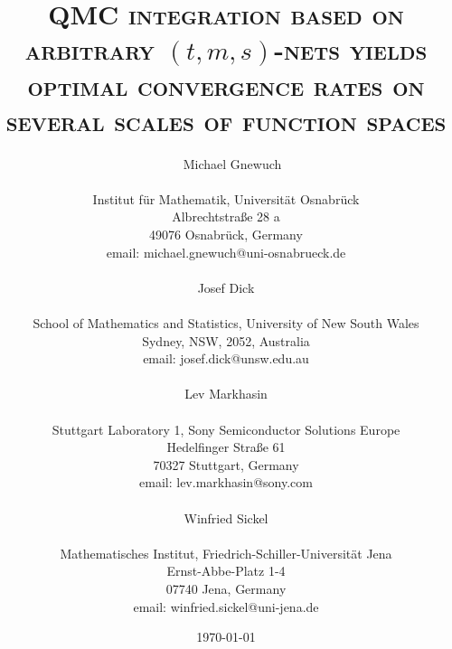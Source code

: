 \documentclass[12pt]{article}
\begin{document}
\title{\scshape 
QMC integration based on arbitrary $(t,m,s)$-nets yields optimal convergence rates on several scales of function spaces}

\author{$\quad$Michael Gnewuch\\$\quad$\\
{\small Institut f\"ur Mathematik,
Universit\"at Osnabr\"uck}\\
{\small Albrechtstra{\ss}e 28 a} \\
{\small 49076 Osnabr\"uck, Germany} \\
{\small email: michael.gnewuch@uni-osnabrueck.de}\\
$\quad$\\
Josef Dick\\$\quad$\\
{\small School of Mathematics and Statistics,
University of New South Wales}\\
{\small Sydney, NSW, 2052, Australia} \\
{\small email: josef.dick@unsw.edu.au}\\
$\quad$\\
Lev  Markhasin\\$\quad$\\
{\small 
Stuttgart Laboratory 1, Sony Semiconductor Solutions Europe}\\
{\small Hedelfinger Stra{\ss}e 61}\\
{\small 70327 Stuttgart, Germany} \\
{\small  email: lev.markhasin@sony.com}\\
$\quad$\\
Winfried  Sickel\\$\quad$\\
{\small 
Mathematisches Institut, Friedrich-Schiller-Universit\"at Jena}\\
{\small Ernst-Abbe-Platz 1-4}\\
{\small 07740 Jena, Germany} \\
{\small  email: winfried.sickel@uni-jena.de}\\
}

\date{\today}
\maketitle
\end{document}
